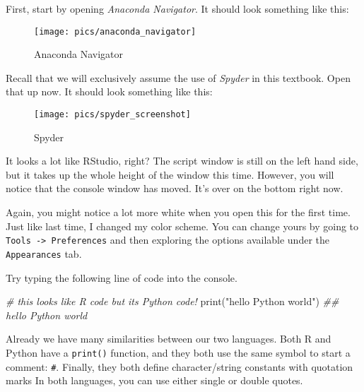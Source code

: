 \documentclass[
  12pt,
  krantz2]{krantz}
\makeatletter
\newenvironment{Shaded}{\begin{snugshade}}{\end{snugshade}}
\newcommand{\BuiltInTok}[1]{#1}
\newcommand{\CommentTok}[1]{\textcolor[rgb]{0.37,0.37,0.37}{\textit{#1}}}
\newcommand{\NormalTok}[1]{#1}
\newcommand{\StringTok}[1]{\textcolor[rgb]{0.5,0.5,0.5}{#1}}
\newenvironment{kframe}{%
\medskip{}
\setlength{\fboxsep}{.8em}
 \def\at@end@of@kframe{}%
 \ifinner\ifhmode%
  \def\at@end@of@kframe{\end{minipage}}%
  \begin{minipage}{\columnwidth}%
 \fi\fi%
 \def\FrameCommand##1{\hskip\@totalleftmargin \hskip-\fboxsep
 \colorbox{shadecolor}{##1}\hskip-\fboxsep
     \hskip-\linewidth \hskip-\@totalleftmargin \hskip\columnwidth}%
 \MakeFramed {\advance\hsize-\width
   \@totalleftmargin\z@ \linewidth\hsize
   \@setminipage}}%
 {\par\unskip\endMakeFramed%
 \at@end@of@kframe}
\renewenvironment{Shaded}{\begin{kframe}}{\end{kframe}}
\makeatother
\begin{document}
First, start by opening \emph{Anaconda Navigator}. It should look something like this:

\begin{figure}

{\centering \texttt{[image: pics/anaconda\_navigator]} 

}

\caption{Anaconda Navigator}\label{fig:anaconda-navigator}
\end{figure}

Recall that we will exclusively assume the use of \emph{Spyder} in this textbook. Open that up now. It should look something like this:

\begin{figure}

{\centering \texttt{[image: pics/spyder\_screenshot]} 

}

\caption{Spyder}\label{fig:spyder}
\end{figure}

It looks a lot like RStudio, right? The script window  is still on the left hand side, but it takes up the whole height of the window this time. However, you will notice that the console window has moved. It's over on the bottom right now.

Again, you might notice a lot more white when you open this for the first time. Just like last time, I changed my color scheme. You can change yours by going to \texttt{Tools\ -\textgreater{}\ Preferences} and then exploring the options available under the \texttt{Appearances} tab.

Try typing the following line of code into the console.

\begin{Shaded}
\begin{Highlighting}[]
\CommentTok{\# this looks like R code but it\textquotesingle{}s Python code!}
\BuiltInTok{print}\NormalTok{(}\StringTok{"hello Python world"}\NormalTok{)}
\CommentTok{\#\# hello Python world}
\end{Highlighting}
\end{Shaded}

Already we have many similarities between our two languages. Both R and Python have a \texttt{print()} function, and they both use the same symbol to start a comment: \texttt{\#}. Finally, they both define character/string constants with quotation marks In both languages, you can use either single or double quotes.
\end{document}
